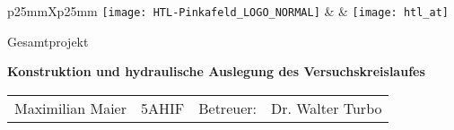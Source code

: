 
\begin{titlepage}


\begin{adjustwidth}{-1cm}{-1cm} %
\enlargethispage{10cm}
\vspace*{-3.5cm}
\begin{center}

\selectfont

\vspace*{10mm}

\begin{tabularx}{\linewidth}{p{25mm}Xp{25mm}}
\texttt{[image: HTL-Pinkafeld\_LOGO\_NORMAL]}
& 
&
\texttt{[image: htl\_at]}
\\ \hline
\end{tabularx}

\vspace*{30mm}

{\fontsize{24}{24}\selectfont
\bfseries\LDinsertworktitle}

\vspace*{20mm}

{\fontsize{12}{12}\selectfont
Gesamtprojekt}

{\fontsize{20}{22}\selectfont
\bfseries\LDinserttitle\par}

\end{center}

\vspace*{35mm}
{\selectfont

{\bfseries 
Konstruktion und hydraulische Auslegung des Versuchskreislaufes
}\\
\begin{tabularx}{\linewidth}{@{}p{4.5cm}p{3.5cm}p{2cm}X@{}}
Maximilian Maier & 5AHIF & Betreuer: & Dr. Walter Turbo\\
\end{tabularx}

}
\end{adjustwidth}
\end{titlepage}
